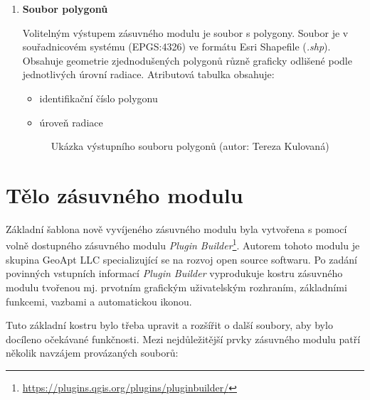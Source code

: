 \begin{enumerate}
QGIS nemá nativní podporu souřadnic v . Pro převod z  do  byla jako nejvhodnější z dostupných variant zvolena část kódu již existujícího zásuvného modulu \textit{Lat Lon Tools Plugin}\footnote{\url{https://github.com/NationalSecurityAgency/qgis-latlontools-plugin}}. Konkrétně se jedná o soubor s názvem \texttt{mgrs.py} a v něm obsaženou metodu \texttt{toMgrs}. Tento zásuvný modul je distribuován pod licencí GNU , stejnou jako vytvářený modul \textit{Radiation reconnaissance results}, což umožnilo jeho využití.  

	\item \textbf{Soubor polygonů}
	
Volitelným výstupem zásuvného modulu je soubor s polygony. Soubor je v souřadnicovém systému  (EPGS:4326) ve formátu Esri Shapefile (\textit{.shp}). Obsahuje geometrie zjednodušených polygonů různě graficky odlišené podle jednotlivých úrovní radiace. Atributová tabulka obsahuje:

		\begin{itemize}
			\item{identifikační číslo polygonu}
			\item{úroveň radiace}
		\end{itemize}

\begin{figure}[H]
    \centering
      \caption[Výstupní polygony]{Ukázka výstupního souboru polygonů (autor: Tereza Kulovaná)}
      \label{fig:polygony}
\end{figure}

\end{enumerate}

\section{Tělo zásuvného modulu}

Základní šablona nově vyvíjeného zásuvného modulu byla vytvořena s pomocí volně dostupného zásuvného modulu \textit{Plugin Builder}\footnote{\url{https://plugins.qgis.org/plugins/pluginbuilder/}}. Autorem tohoto modulu je skupina GeoApt LLC specializující se na rozvoj open source softwaru. Po zadání povinných vstupních informací \textit{Plugin Builder} vyprodukuje kostru zásuvného modulu tvořenou mj. prvotním grafickým uživatelským rozhraním, základními funkcemi, vazbami a automatickou ikonou.

Tuto základní kostru bylo třeba upravit a rozšířit o další soubory, aby bylo docíleno očekávané funkčnosti. Mezi nejdůležitější prvky zásuvného modulu patří několik navzájem provázaných souborů:

